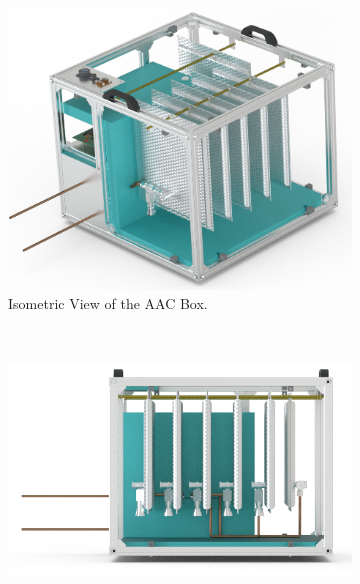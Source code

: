 \documentclass[a4paper,12pt,oneside]{article}
\providecommand{\DIFdelend}{} %
\DeclareRobustCommand{\DIFdelend}{\DIFOaddend \let\includegraphics\DIFOincludegraphics} %
\begin{document}



\DIFdelend \begin{figure}[H]
    \centering
    \begin{subfigure}[b]{0.47\textwidth}
        \includegraphics[width=\textwidth]{4-experiment-design/img/Mechanical/Figure_22a.png}
         \caption{Isometric View of the AAC Box.}
    \label{iso_aac}
    \end{subfigure}
    ~
    \begin{subfigure}[b]{0.47\textwidth}
        \centering
         \includegraphics[width=\textwidth]{4-experiment-design/img/Mechanical/Figure_22b.png}

\end{subfigure}
\end{figure}
\end{document}
